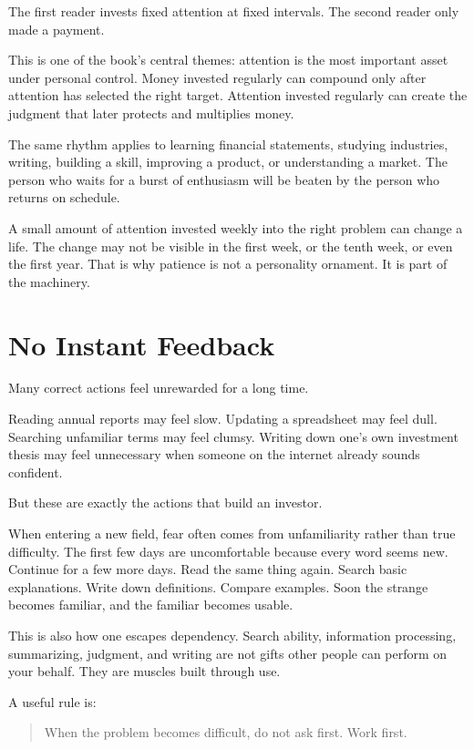 The first reader invests fixed attention at fixed intervals. The second reader only made a payment.

This is one of the book's central themes: attention is the most important asset under personal control. Money invested regularly can compound only after attention has selected the right target. Attention invested regularly can create the judgment that later protects and multiplies money.

The same rhythm applies to learning financial statements, studying industries, writing, building a skill, improving a product, or understanding a market. The person who waits for a burst of enthusiasm will be beaten by the person who returns on schedule.

A small amount of attention invested weekly into the right problem can change a life. The change may not be visible in the first week, or the tenth week, or even the first year. That is why patience is not a personality ornament. It is part of the machinery.

\section*{No Instant Feedback}

Many correct actions feel unrewarded for a long time.

Reading annual reports may feel slow. Updating a spreadsheet may feel dull. Searching unfamiliar terms may feel clumsy. Writing down one's own investment thesis may feel unnecessary when someone on the internet already sounds confident.

But these are exactly the actions that build an investor.

When entering a new field, fear often comes from unfamiliarity rather than true difficulty. The first few days are uncomfortable because every word seems new. Continue for a few more days. Read the same thing again. Search basic explanations. Write down definitions. Compare examples. Soon the strange becomes familiar, and the familiar becomes usable.

This is also how one escapes dependency. Search ability, information processing, summarizing, judgment, and writing are not gifts other people can perform on your behalf. They are muscles built through use.

A useful rule is:

\begin{quote}
When the problem becomes difficult, do not ask first. Work first.
\end{quote}

